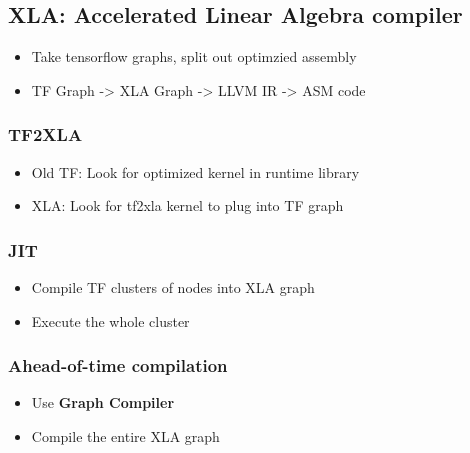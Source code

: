 \documentclass[11pt]{article}
\begin{document}
\subsection{XLA: Accelerated Linear Algebra compiler}
\label{sec:org13b8316}
\begin{itemize}
\item Take tensorflow graphs, split out optimzied assembly
\item TF Graph -> XLA Graph -> LLVM IR -> ASM code
\end{itemize}
\subsubsection{TF2XLA}
\label{sec:org9571a6a}
\begin{itemize}
\item Old TF: Look for optimized kernel in runtime library
\item XLA: Look for tf2xla kernel to plug into TF graph
\end{itemize}
\subsubsection{JIT}
\label{sec:org101a67a}
\begin{itemize}
\item Compile TF clusters of nodes into XLA graph
\item Execute the whole cluster
\end{itemize}
\subsubsection{Ahead-of-time compilation}
\label{sec:orgb3cdb53}
\begin{itemize}
\item Use \textbf{Graph Compiler}
\item Compile the entire XLA graph
\end{itemize}
\end{document}
